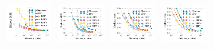 \begin{figure}
	\centering
	\begin{tabular}{@{\hskip 0in}c@{\hskip 0in}c@{\hskip 0in}c@{\hskip 0in}c@{\hskip 0in}}
		\includegraphics[width=0.26\linewidth]{figures/census_MSE_vs_n_memory_all_line.pdf} &
		\includegraphics[width=0.26\linewidth]{figures/yearpred_MSE_vs_n_memory_all_line.pdf} &
		\includegraphics[width=0.26\linewidth]{figures/covtype_error_vs_n_memory_all_line.pdf} &
		\includegraphics[width=0.26\linewidth]{figures/timit_error_vs_n_memory_all_line.pdf} \\

\end{tabular}
\end{figure}
